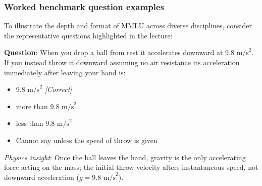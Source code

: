 \documentclass[../../main.tex]{subfiles}
\begin{document}
\subsubsection{Worked benchmark question examples}
To illustrate the depth and format of MMLU across diverse disciplines, consider the representative questions highlighted in the lecture:

\begin{center}
\begin{minipage}{0.95\textwidth}
\begin{tcolorbox}[colback=cardBg,colframe=cardLine,arc=2pt,boxrule=0.5pt,title=\textbf{MMLU Example 1: Conceptual Physics}]
\small\sffamily
\textbf{Question}: When you drop a ball from rest it accelerates downward at $9.8\text{ m/s}^2$. If you instead throw it downward assuming no air resistance its acceleration immediately after leaving your hand is:
\begin{itemize}[leftmargin=1.5em,itemsep=1pt]
    \item[\textbf{(A)}] $9.8\text{ m/s}^2$ \hfill \textit{[Correct]}
    \item[\textbf{(B)}] more than $9.8\text{ m/s}^2$
    \item[\textbf{(C)}] less than $9.8\text{ m/s}^2$
    \item[\textbf{(D)}] Cannot say unless the speed of throw is given
\end{itemize}
\textit{Physics insight}: Once the ball leaves the hand, gravity is the only accelerating force acting on the mass; the initial throw velocity alters instantaneous speed, not downward acceleration ($g = 9.8\text{ m/s}^2$).
\end{tcolorbox}
\end{minipage}
\end{center}

\vspace{0.2cm}
\end{document}
